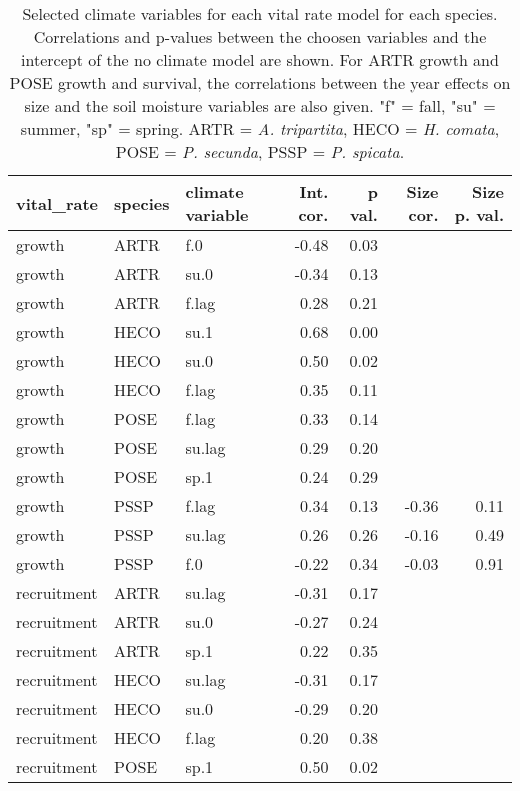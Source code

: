 \begin{table}[ht]
\centering
\caption{Selected climate variables for each vital rate model for each species. Correlations and p-values between the choosen variables and the intercept of the no climate model are shown. For ARTR growth and POSE growth and survival, the correlations between the year effects on size and the soil moisture variables are also given. "f" = fall, "su" = summer, "sp" = spring. ARTR = \textit{A. tripartita}, HECO = \textit{H. comata}, POSE = \textit{P. secunda}, PSSP = \textit{P. spicata}.} 
\label{table:strongCor}
\begin{tabular}{lllrrrr}
  \hline
vital\_rate & species & climate variable & Int. cor. & p val. & Size cor. & Size p. val. \\ 
  \hline
growth & ARTR & f.0 & -0.48 & 0.03 &  &  \\ 
  growth & ARTR & su.0 & -0.34 & 0.13 &  &  \\ 
  growth & ARTR & f.lag & 0.28 & 0.21 &  &  \\ 
  growth & HECO & su.1 & 0.68 & 0.00 &  &  \\ 
  growth & HECO & su.0 & 0.50 & 0.02 &  &  \\ 
  growth & HECO & f.lag & 0.35 & 0.11 &  &  \\ 
  growth & POSE & f.lag & 0.33 & 0.14 &  &  \\ 
  growth & POSE & su.lag & 0.29 & 0.20 &  &  \\ 
  growth & POSE & sp.1 & 0.24 & 0.29 &  &  \\ 
  growth & PSSP & f.lag & 0.34 & 0.13 & -0.36 & 0.11 \\ 
  growth & PSSP & su.lag & 0.26 & 0.26 & -0.16 & 0.49 \\ 
  growth & PSSP & f.0 & -0.22 & 0.34 & -0.03 & 0.91 \\ 
  recruitment & ARTR & su.lag & -0.31 & 0.17 &  &  \\ 
  recruitment & ARTR & su.0 & -0.27 & 0.24 &  &  \\ 
  recruitment & ARTR & sp.1 & 0.22 & 0.35 &  &  \\ 
  recruitment & HECO & su.lag & -0.31 & 0.17 &  &  \\ 
  recruitment & HECO & su.0 & -0.29 & 0.20 &  &  \\ 
  recruitment & HECO & f.lag & 0.20 & 0.38 &  &  \\ 
  recruitment & POSE & sp.1 & 0.50 & 0.02 &  &  \\ 

\end{tabular}
\end{table}
